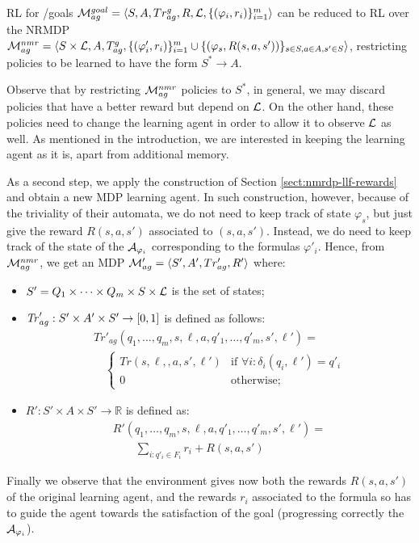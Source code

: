 \begin{theorem}\label{th:goal-nmr}
	RL for \LTLf /\LDLf goals
	$\mathcal{M}_{ag}^{goal}= \langle S, A, Tr^{g}_{ag}, R, \mathcal{L},
	\{(\varphi_i,r_i)\}_{i=1}^{m}\rangle$ can be reduced to RL over the
	NRMDP
	$\mathcal{M}_{ag}^{nmr} = \langle S\times \mathcal{L}, A, T_{ag}^{g},
	\{(\varphi'_i,r_i)\}_{i=1}^{m}\cup \{(\varphi_s, R(s,a, s'))\}_{s\in S,
		a\in A, s'\in S} \rangle$, 
	restricting policies to be learned to have the form $S^*\rightarrow A$.
\end{theorem}

Observe that by restricting $\mathcal{M}_{ag}^{nmr}$ policies to $S^*$, in general, we may discard policies that have a better reward but depend on $\mathcal{L}$. On the other hand, these policies need to change the learning agent in order to allow it to observe $\mathcal{L}$ as well. As mentioned in the introduction, we are interested in keeping the learning agent as it is, apart from additional memory.

\medskip
As a second step, we apply the construction of Section \ref{sect:nmrdp-llf-rewards} and obtain a
new MDP learning agent.  In such construction, however, because of the
triviality of their automata, we do not need to keep track of state
$\varphi_s$, but just give the reward $R(s,a,s')$ associated to
$(s,a,s')$. Instead, we do need to keep track of the state of the \DFAs
$\mathcal{A}_{\varphi_i}$ corresponding to the formulas $\varphi'_i$.
Hence, from $\mathcal{M}_{ag}^{nmr}$, we get an MDP $\mathcal{M}_{ag}'=\langle S',A',Tr'_{ag},R'\rangle$ where:
\begin{itemize}\itemsep=0mm
	\item $S'=Q_1\times\cdots\times Q_m\times S\times \mathcal{L}$ is the set of states;
	\item $\mathit{Tr}'_{ag} : S'\times A' \times S'\rightarrow [0,1]$ is defined as follows:
	\[
	\begin{array}{l}
	Tr'_{ag}(q_1,\ldots,q_m, s,\ell, a, q'_1,\ldots,q'_m, s',\ell') = {}\\
	\quad\left\{
	\begin{array}{ll}
	Tr(s,\ell,,a,s',\ell') &\mbox{if } \forall i:\delta_i(q_i,\ell') = q'_i\\
	0 & \mbox{otherwise}; 
	\end{array}\right.
	\end{array}
	\] 
	\item $R': S'\times A \times S' \rightarrow 
	\mathbb{R}$ is defined as:
	\[\begin{array}{l}
	R'(q_1,\ldots,q_m, s,\ell, a, q'_1,\ldots,q'_m, s',\ell') = {}\\
	\qquad
	\sum_{i: q'_i\in F_i} r_i+R(s,a,s')
	\end{array}
	\] 
\end{itemize}
Finally we observe that the environment gives now both the rewards $R(s,a,s')$ of the original learning agent, and the rewards $r_i$ associated to the formula so has to guide the agent towards the satisfaction of the goal (progressing correctly the \DFAs $\mathcal{A}_{\varphi_i}$).

